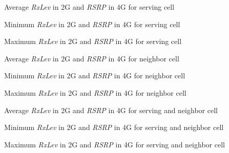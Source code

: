 %
{Average \textit{RxLev} in 2G and \textit{RSRP} in 4G for serving cell}

%
{Minimum \textit{RxLev} in 2G and \textit{RSRP} in 4G  for serving cell}

%
{Maximum \textit{RxLev} in 2G and \textit{RSRP} in 4G for serving cell}


%
{Average \textit{RxLev} in 2G and \textit{RSRP} in 4G for neighbor cell}

%
{Minimum \textit{RxLev} in 2G and \textit{RSRP} in 4G  for neighbor cell}

%
{Maximum \textit{RxLev} in 2G and \textit{RSRP} in 4G for neighbor cell}


%
{Average \textit{RxLev} in 2G and \textit{RSRP} in 4G for serving and neighbor cell}

%
{Minimum \textit{RxLev} in 2G and \textit{RSRP} in 4G for serving and neighbor cell}

%
{Maximum \textit{RxLev} in 2G and \textit{RSRP} in 4G for serving and neighbor cell}

